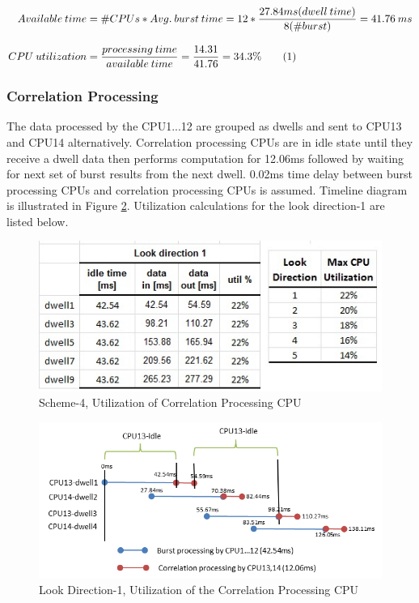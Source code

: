 \begin{align*}
	Available \: time &= \#CPUs * Avg. \: burst \: time = 12 * \frac{27.84ms (dwell \: time)}{8(\#burst)} = 41.76 \: ms\\[0.3cm]
	CPU \: utilization &= \frac{processing \: time}{available \: time} = \frac{14.31}{41.76} = 34.3\% \stepcounter{equation}\tag{\theequation} 
\end{align*}

\subsubsection{Correlation Processing} 
The data processed by the CPU1...12 are grouped as dwells and sent to CPU13 and CPU14 alternatively. Correlation processing CPUs are in idle state until they receive a dwell data then performs computation for 12.06ms followed by waiting for next set of burst results from the next dwell. 0.02ms time delay between burst processing CPUs and correlation processing CPUs is assumed. Timeline diagram is illustrated in Figure \ref{fig:mm:scheme5_corr_timeline}. Utilization calculations for the look direction-1 are listed below. 

\begin{figure}[h!]
	\centering
	\includegraphics[]{figures/scheme5_mul_cpu_util}
	\caption{Scheme-4, Utilization of Correlation Processing CPU}
	\label{fig:mm:scheme5_mul_cpu_util}
\end{figure}

\begin{figure}[h!]
	\centering
	\includegraphics[]{figures/scheme5_corr_timeline}
	\caption{Look Direction-1, Utilization of the Correlation Processing CPU}
	\label{fig:mm:scheme5_corr_timeline}
\end{figure}


